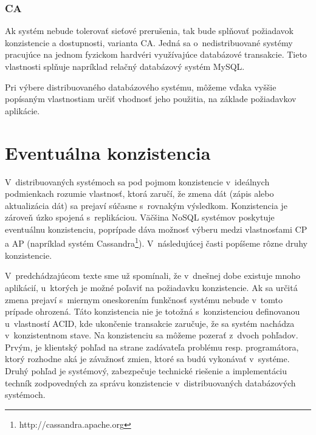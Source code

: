 \documentclass[11pt,twoside,a4paper]{book}
\begin{document}
\subsubsection*{CA}
Ak systém nebude tolerovať sieťové prerušenia, tak bude splňovať požiadavok konzistencie a dostupnosti, varianta CA. Jedná sa o~nedistribuované systémy pracujúce na jednom fyzickom hardvéri využívajúce databázové transakcie. Tieto vlastnosti splňuje napríklad relačný databázový systém MySQL.


Pri výbere distribuovaného databázového systému, môžeme vďaka vyššie popísaným vlastnostiam určiť vhodnosť jeho použitia, na základe požiadavkov aplikácie.
%




\section{Eventuálna konzistencia}
V~distribuovaných systémoch sa pod pojmom konzistencie v~ideálnych podmienkach rozumie vlastnosť, ktorá zaručí, že zmena dát (zápis alebo aktualizácia dát) sa prejaví súčasne s~rovnakým výsledkom. Konzistencia je zároveň úzko spojená s~replikáciou. Väčšina NoSQL systémov poskytuje eventuálnu konzistenciu, poprípade dáva možnosť výberu medzi vlastnosťami CP a AP (napríklad systém Cassandra\footnote{http://cassandra.apache.org}). V~následujúcej časti popíšeme rôzne druhy konzistencie.

V~predchádzajúcom texte sme už spomínali, že v~dnešnej dobe existuje mnoho aplikácií, u~ktorých je možné poľaviť na požiadavku konzistencie. Ak sa určitá zmena prejaví s~miernym oneskorením funkčnosť systému nebude v~tomto prípade ohrozená. Táto konzistencia nie je totožná s~konzistenciou definovanou u~vlastností ACID, kde ukončenie transakcie zaručuje, že sa systém nachádza v~konzistentnom stave. Na konzistenciu sa môžeme pozerať z~dvoch pohľadov. Prvým, je klientský pohľad na strane zadávateľa problému resp. programátora, ktorý rozhodne aká je závažnosť zmien, ktoré sa budú vykonávať v~systéme. Druhý pohľad je systémový, zabezpečuje technické riešenie a implementáciu techník zodpovedných za správu konzistencie v~distribuovaných databázových systémoch.
\end{document}
